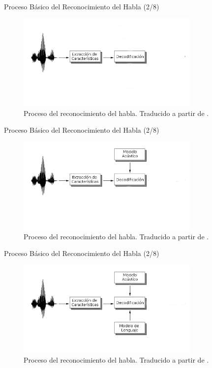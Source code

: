 \begin{frame}{Proceso B\'asico del Reconocimiento del Habla (2/8)}

\begin{figure}[H]  
\centering
\includegraphics[width=0.8\textwidth]{./graphics/proceso_1.png}
\caption{Proceso del reconocimiento del habla. Traducido a partir de \protect\cite{VerenichASR}.}
\label{figure:proceso}
\end{figure}
\end{frame}

\begin{frame}{Proceso B\'asico del Reconocimiento del Habla (2/8)}

\begin{figure}[H] 
\centering
\includegraphics[width=0.8\textwidth]{./graphics/proceso_2.png}
\caption{Proceso del reconocimiento del habla. Traducido a partir de \protect\cite{VerenichASR}.}
\label{figure:proceso}
\end{figure}
\end{frame}

\begin{frame}{Proceso B\'asico del Reconocimiento del Habla (2/8)}

\begin{figure}[H] 
\centering
\includegraphics[width=0.8\textwidth]{./graphics/proceso_3.png}
\caption{Proceso del reconocimiento del habla. Traducido a partir de \protect\cite{VerenichASR}.}
\label{figure:proceso}
\end{figure}
\end{frame}

